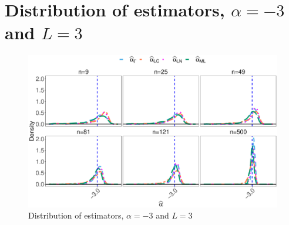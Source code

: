 \documentclass[onecolumn]{svjour3}
\begin{document}
\section{Distribution of estimators, $\alpha=-3$ and $L=3$}
\begin{figure}[hbt]
	\centering
	\includegraphics[width=0.7\linewidth]{../../../Figures/PaperTesis/DensidadEstimadorNoCont.eps}
	\caption{ Distribution of estimators, $\alpha=-3$ and  $L=3$ }\label{Fig:DistEstimator}
\end{figure}
\end{document}
